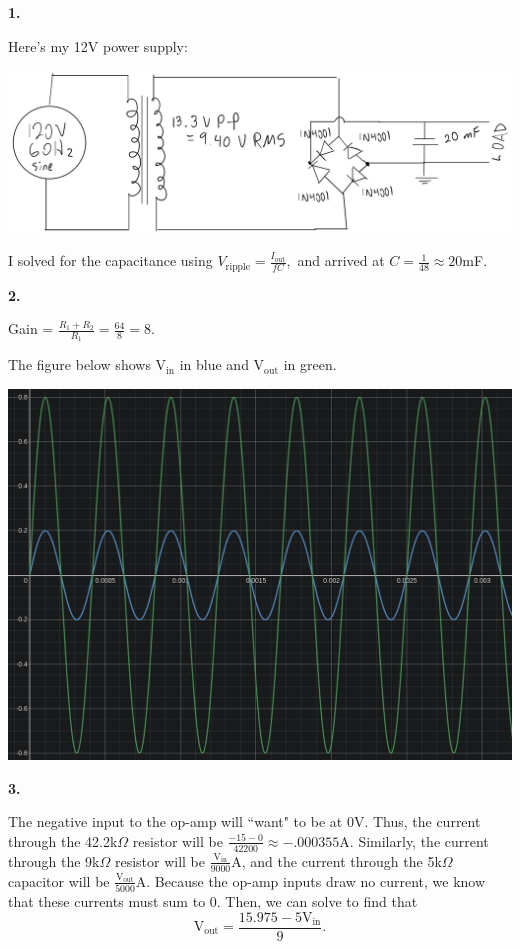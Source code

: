 \documentclass{article}
\begin{document}
\medskip\noindent\textbf{1.} 

    Here's my 12V power supply:
    \begin{center} \includegraphics[scale=.3]{power_supply.png} \end{center}

    I solved for the capacitance using $V_{\text{ripple}} = \frac{I_{\text{out}}}{fC},$ and arrived at $C = \frac{1}{48} \approx 20$mF.

\medskip\noindent\textbf{2.} 

    Gain = $\frac{R_1 + R_2}{R_1} = \frac{64}{8} = 8.$

    The figure below shows $\text{V}_{\text{in}}$ in blue and $\text{V}_{\text{out}}$ in green.
    \begin{center}
        \includegraphics[scale=.5]{2.png}
    \end{center}

\newpage\noindent\textbf{3.}

    The negative input to the op-amp will ``want" to be at 0V.
    Thus, the current through the 42.2k$\Omega$ resistor will be $\frac{-15-0}{42200} \approx -.000355$A.
    Similarly, the current through the 9k$\Omega$ resistor will be $\frac{\text{V}_{\text{in}}}{9000}$A, and the current through the 5k$\Omega$ capacitor will be $\frac{\text{V}_{\text{out}}}{5000}$A.
    Because the op-amp inputs draw no current, we know that these currents must sum to 0.
    Then, we can solve to find that $$\text{V}_{\text{out}} = \frac{15.975-5\text{V}_{\text{in}}}{9}.$$
\end{document}
